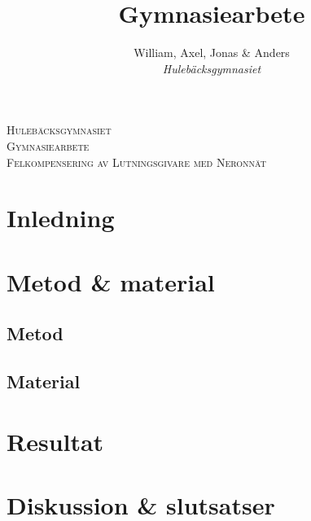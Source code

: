\documentclass[]{article}
\title{Gymnasiearbete}
\author{William, Axel, Jonas \& Anders \\
\emph{Hulebäcksgymnasiet}}
\begin{document}
\begin{titlepage}
	\centering

	\vspace{5cm}
	{\scshape\LARGE Hulebäcksgymnasiet} \\
	\vspace{2cm}
	{\scshape\Large Gymnasiearbete} \\
	\vspace{3cm}
	{\scshape\huge Felkompensering av Lutningsgivare med Neronnät}

\end{titlepage}

\section{Inledning}



\section{Metod \& material}

\subsection{Metod}

\subsection{Material}

\section{Resultat}

\section{Diskussion \& slutsatser}
\end{document}
